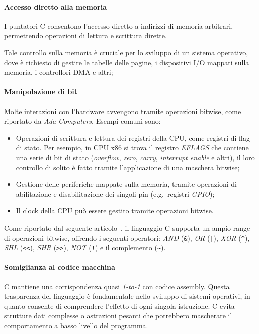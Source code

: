 \paragraph{Accesso diretto alla memoria}
I puntatori C consentono l'accesso diretto a
indirizzi di memoria arbitrari, permettendo operazioni di lettura e 
scrittura dirette. 

Tale controllo sulla memoria è cruciale per lo sviluppo di un 
sistema operativo, dove è richiesto di gestire le tabelle delle pagine, i dispositivi I/O mappati sulla memoria, i controllori DMA e altri;

\paragraph{Manipolazione di bit}
Molte interazioni con l'hardware avvengono tramite operazioni bitwise, come riportato da \textit{Ada Computers}\cite{bitwise-operations}. 
Esempi comuni sono:
\begin{itemize}
    \item Operazioni di scrittura e lettura dei registri della CPU, come registri di flag di stato. Per esempio, in CPU x86 si trova il registro \textit{EFLAGS} che contiene una serie di bit di stato (\textit{overflow}, \textit{zero}, \textit{carry}, \textit{interrupt enable} e altri), il loro controllo di solito è fatto tramite l'applicazione di una maschera bitwise;
    \item Gestione delle periferiche mappate sulla memoria, tramite operazioni di abilitazione e disabilitazione dei singoli pin (e.g.\  registri \textit{GPIO});
    \item Il clock della CPU può essere gestito tramite operazioni bitwise.
\end{itemize}
Come riportato dal seguente articolo~\cite{bitwise-operations-c}, il linguaggio C supporta un ampio range di operazioni bitwise, offrendo i seguenti operatori: \textit{AND} (\verb|&|), \textit{OR} (\verb+|+), \textit{XOR} (\verb|^|), \textit{SHL} (\verb|<<|), \textit{SHR} (\verb|>>|), \textit{NOT} (\verb|!|) e il complemento (\verb|~|).

\paragraph{Somiglianza al codice macchina}
C mantiene una corrispondenza quasi \textit{1-to-1} con codice assembly. 
Questa trasparenza del linguaggio è fondamentale nello sviluppo di 
sistemi operativi, in quanto consente di comprendere l'effetto di ogni singola istruzione. 
C evita strutture dati complesse o astrazioni pesanti che potrebbero mascherare
il comportamento a basso livello del programma.

